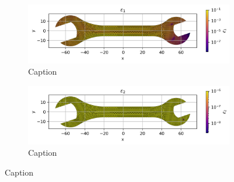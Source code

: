     \begin{figure}[H]
        \centering
        \begin{subfigure}[t]{0.49\textwidth}
        \centering
        \includegraphics[width=\textwidth]{GRAFICOS/Case c - epsilon_1_per_element.png}
        \caption{Caption}
        \label{fig:deformada_reacciones}
        \end{subfigure}
        \hfill
        \begin{subfigure}[t]{0.49\textwidth}
        \centering
        \includegraphics[width=\textwidth]{GRAFICOS/Case c - epsilon_2_per_element.png}
        \caption{Caption}
        \label{fig:von_mises}
        \end{subfigure}
        \caption{Caption}
        \label{fig:analisis_estructural}
    \end{figure}

